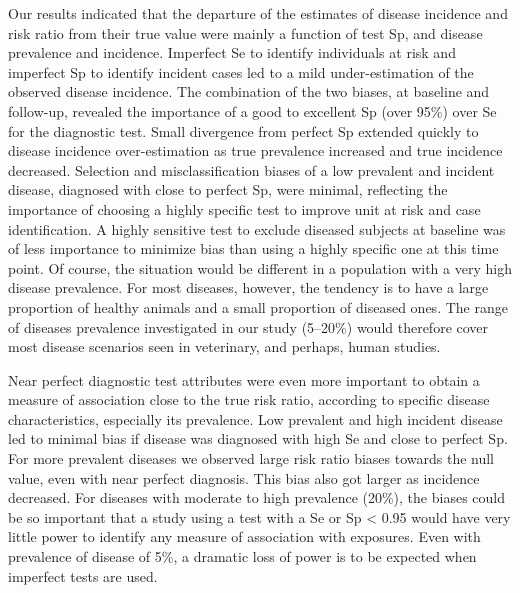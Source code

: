 Our results indicated that the departure of the estimates of disease incidence
and risk ratio from their true value were mainly a function of test Sp, and
disease prevalence and incidence.
Imperfect Se to identify individuals at risk and imperfect Sp to identify
incident cases led to a mild under-estimation of the observed disease incidence.
The combination of the two biases, at baseline and follow-up, revealed the
importance of a good to excellent Sp (over 95\%) over Se for the diagnostic
test.
Small divergence from perfect Sp extended quickly to disease incidence
over-estimation as true prevalence increased and true incidence decreased.
Selection and misclassification biases of a low prevalent and incident
disease, diagnosed with close to perfect Sp, were minimal, reflecting the
importance of choosing a highly specific test to improve unit at risk and case
identification.
A highly sensitive test to exclude diseased subjects at baseline was of less
importance to minimize bias than using a highly specific one at this time point.
Of course, the situation would be different in a population with a very high
disease prevalence.
For most diseases, however, the tendency is to have a large proportion of
healthy animals and a small proportion of diseased ones.
The range of diseases prevalence investigated in our study (5--20\%) would
therefore cover most disease scenarios seen in veterinary, and perhaps, human
studies.

Near perfect diagnostic test attributes were even more important to obtain a
measure of association close to the true risk ratio, according to specific
disease characteristics, especially its prevalence.
Low prevalent and high incident disease led to minimal bias if disease was
diagnosed with high Se and close to perfect Sp.
For more prevalent diseases we observed large risk ratio biases towards the
null value, even with near perfect diagnosis.
This bias also got larger as incidence decreased.
For diseases with moderate to high prevalence (20\%), the biases could be so
important that a study using a test with a Se or Sp < 0.95
would have very little power to identify any measure of association with
exposures.
Even with prevalence of disease of 5\%, a dramatic loss of power is to be
expected when imperfect tests are used.

